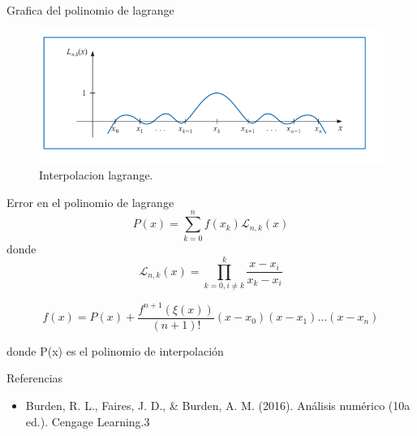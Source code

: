 \documentclass{beamer}
\begin{document}
\begin{frame}{Grafica del polinomio de lagrange}
 \begin{center}
    \begin{figure}
    \includegraphics[width=1.0\textwidth]{lagrange02.png}
    \caption{Interpolacion lagrange.} 
    \end{figure} 
    \end{center}
\end{frame}

\begin{frame}{Error en el polinomio de lagrange}
 \[
    P(x) = \sum_{k=0}^n f(x_k) \mathscr{L}_{n,k}(x)
    \]
    donde
    \[
    \mathscr{L}_{n,k}(x) = \prod_{k=0,i\neq k}^k \frac{x-x_i}{x_k-x_i}
    \]

\[
f(x) = P(x) + \frac{f^{n+1}(\xi(x))}{(n+1)!} (x-x_0)(x-x_1)...(x-x_n)
\]

donde P(x) es el polinomio de interpolación
\end{frame}


\begin{frame}{Referencias}
\begin{itemize}
 \item Burden, R. L., Faires, J. D., & Burden, A. M. (2016). Análisis numérico (10a ed.). Cengage Learning.3

\end{itemize}
\end{frame}
\end{document}
